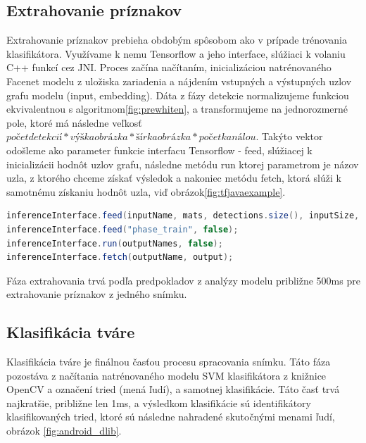 \subsection{Extrahovanie príznakov}
Extrahovanie príznakov prebieha obdobým spôsobom ako v prípade trénovania klasifikátora.
Využívame k nemu Tensorflow a jeho interface, slúžiaci k volaniu C++ funkcí cez JNI.
Proces začína načítaním, inicializáciou natrénovaného Facenet modelu z uložiska zariadenia a nájdením vstupných a výstupných uzlov grafu modelu (input, embedding).
Dáta z fázy detekcie normalizujeme funkciou ekvivalentnou s algoritmom\ref{fig:prewhiten}, a transformujeme na jednorozmerné pole, ktoré má následne veľkosť $ počet detekcií * výška obrázka * šírka obrázka * počet kanálou$.
Takýto vektor odošleme ako parameter funkcie interfacu Tensorflow - feed, slúžiacej k inicializácii hodnôt uzlov grafu, následne metódu run ktorej parametrom je názov uzla, z ktorého chceme získať výsledok a nakoniec metódu fetch, ktorá slúži k samotnému získaniu hodnôt uzla, viď obrázok\ref{fig:tfjavaexample}.

\begin{lstlisting}[language=Java, label={fig:tfjavaexample}, caption={Extrakcia príznakov pomocou Facenet na zariadení Android}]
inferenceInterface.feed(inputName, mats, detections.size(), inputSize, inputSize, 3);
inferenceInterface.feed("phase_train", false);
inferenceInterface.run(outputNames, false);
inferenceInterface.fetch(outputName, output);
\end{lstlisting}

\indent Fáza extrahovania trvá podľa predpokladov z analýzy modelu približne 500ms pre extrahovanie príznakov z jedného snímku.

\subsection{Klasifikácia tváre}
Klasifikácia tváre je finálnou časťou procesu spracovania snímku.
Táto fáza pozostáva z načítania natrénovaného modelu SVM klasifikátora z knižnice OpenCV a označení tried (mená ľudí), a samotnej klasifikácie.
Táto časť trvá najkratšie, približne len 1ms, a výsledkom klasifikácie sú identifikátory klasifikovaných tried, ktoré sú následne nahradené skutočnými menami ľudí, obrázok \ref{fig:android_dlib}.

